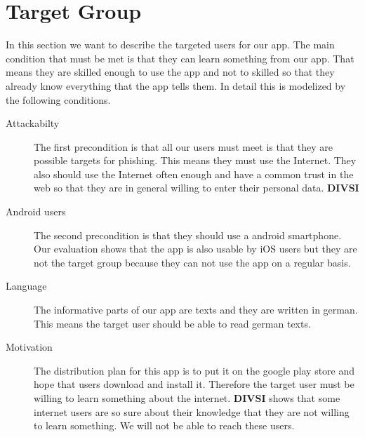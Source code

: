 \section{Target Group}
\label{s:target_group}
In this section we want to describe the targeted users for our app.
The main condition that must be met is that they can learn something from our app.
That means they are skilled enough to use the app and not to skilled so that they already know everything that the app tells them.
In detail this is modelized by the following conditions.
\begin{description}
\item[Attackabilty] The first precondition is that all our users must meet is that they are possible targets for phishing.
This means they must use the Internet.
They also should use the Internet often enough and have a common trust in the web so that they are in general willing to enter their personal data.
\textbf{DIVSI}
\item[Android users] The second precondition is that they should use a android smartphone.
Our evaluation shows that the app is also usable by iOS users but they are not the target group because they can not use the app on a regular basis.
\item[Language] The informative parts of our app are texts and they are written in german.
This means the target user should be able to read german texts.
\item[Motivation] The distribution plan for this app is to put it on the google play store and hope that users download and install it.
Therefore the target user must be willing to learn something about the internet.
\textbf{DIVSI} shows that some internet users are so sure about their knowledge that they are not willing to learn something.
We will not be able to reach these users.
\end{description}

